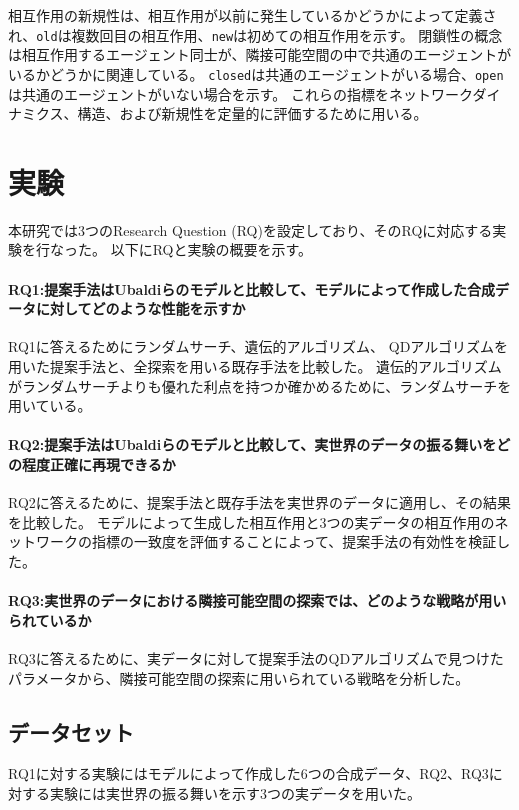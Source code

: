 \documentclass[uplatex,11pt,openany]{ujreport}
\begin{document}
        相互作用の新規性は、相互作用が以前に発生しているかどうかによって定義され、\verb|old|は複数回目の相互作用、\verb|new|は初めての相互作用を示す。
        閉鎖性の概念は相互作用するエージェント同士が、隣接可能空間の中で共通のエージェントがいるかどうかに関連している。
        \verb|closed|は共通のエージェントがいる場合、\verb|open|は共通のエージェントがいない場合を示す。
        これらの指標をネットワークダイナミクス、構造、および新規性を定量的に評価するために用いる。


\chapter{実験}
    本研究では3つのResearch Question (RQ)を設定しており、そのRQに対応する実験を行なった。
    以下にRQと実験の概要を示す。
        \subsubsection*{RQ1:提案手法はUbaldiらのモデルと比較して、モデルによって作成した合成データに対してどのような性能を示すか}
            RQ1に答えるためにランダムサーチ、遺伝的アルゴリズム、 QDアルゴリズムを用いた提案手法と、全探索を用いる既存手法を比較した。
            遺伝的アルゴリズムがランダムサーチよりも優れた利点を持つか確かめるために、ランダムサーチを用いている。
        \subsubsection*{RQ2:提案手法はUbaldiらのモデルと比較して、実世界のデータの振る舞いをどの程度正確に再現できるか}
            RQ2に答えるために、提案手法と既存手法を実世界のデータに適用し、その結果を比較した。
            モデルによって生成した相互作用と3つの実データの相互作用のネットワークの指標の一致度を評価することによって、提案手法の有効性を検証した。
        \subsubsection*{RQ3:実世界のデータにおける隣接可能空間の探索では、どのような戦略が用いられているか}
            RQ3に答えるために、実データに対して提案手法のQDアルゴリズムで見つけたパラメータから、隣接可能空間の探索に用いられている戦略を分析した。

    \section{データセット}
        RQ1に対する実験にはモデルによって作成した6つの合成データ、RQ2、RQ3に対する実験には実世界の振る舞いを示す3つの実データを用いた。
\end{document}

